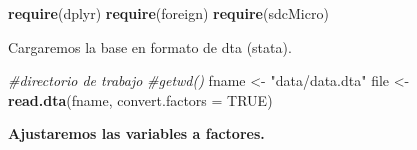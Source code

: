 \documentclass[]{book}
\newenvironment{Shaded}{\begin{snugshade}}{\end{snugshade}}
\newcommand{\CommentTok}[1]{\textcolor[rgb]{0.56,0.35,0.01}{\textit{#1}}}
\newcommand{\DataTypeTok}[1]{\textcolor[rgb]{0.13,0.29,0.53}{#1}}
\newcommand{\KeywordTok}[1]{\textcolor[rgb]{0.13,0.29,0.53}{\textbf{#1}}}
\newcommand{\NormalTok}[1]{#1}
\newcommand{\OtherTok}[1]{\textcolor[rgb]{0.56,0.35,0.01}{#1}}
\newcommand{\StringTok}[1]{\textcolor[rgb]{0.31,0.60,0.02}{#1}}
\theoremstyle{definition}
\theoremstyle{definition}
\theoremstyle{definition}
\theoremstyle{definition}
\theoremstyle{remark}
\begin{document}
\begin{Shaded}
\begin{Highlighting}[]
\KeywordTok{require}\NormalTok{(dplyr)}
\KeywordTok{require}\NormalTok{(foreign)}
\KeywordTok{require}\NormalTok{(sdcMicro)}
\end{Highlighting}
\end{Shaded}

Cargaremos la base en formato de dta (stata).

\begin{Shaded}
\begin{Highlighting}[]
\CommentTok{#directorio de trabajo}
\CommentTok{#getwd()}
\NormalTok{fname <-}\StringTok{ "data/data.dta"}
\NormalTok{file <-}\StringTok{ }\KeywordTok{read.dta}\NormalTok{(fname, }\DataTypeTok{convert.factors =} \OtherTok{TRUE}\NormalTok{)}
\end{Highlighting}
\end{Shaded}

\textbf{Ajustaremos las variables a factores.}
\end{document}

